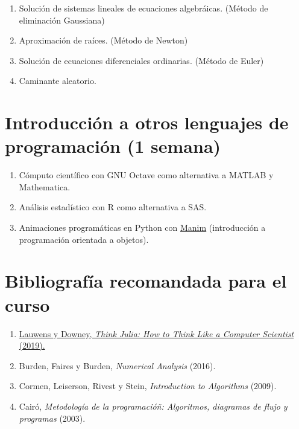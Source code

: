 \documentclass[a4paper]{article}
\begin{document}
\begin{enumerate}[label=\arabic*.]

    \item Solución de sistemas lineales de ecuaciones algebráicas. (Método de eliminación Gaussiana)
    \item Aproximación de raíces. (Método de Newton)
    \item Solución de ecuaciones diferenciales ordinarias. (Método de Euler)
    \item Caminante aleatorio.
\end{enumerate}

\section{Introducción a otros lenguajes de programación (1 semana)} \label{Sec: Introducción a otros lenguajes de programación (1 semana)}

\begin{enumerate}[label=\arabic*.]

    \item Cómputo científico con GNU Octave como alternativa a MATLAB y Mathematica.
    \item Análisis estadístico con R como alternativa a SAS.
    \item Animaciones programáticas en Python con \hyperlink{https://github.com/ManimCommunity/manim}{Manim} (introducción a programación orientada a objetos).
\end{enumerate}

\section*{Bibliografía recomandada para el curso} \label{Sec: Bibliografía}

\begin{enumerate}

    \item \href{https://benlauwens.github.io/ThinkJulia.jl/latest/book.html}{Lauwens y Downey, \emph{Think Julia: How to Think Like a Computer Scientist} (2019).}

    \item Burden, Faires y Burden, \emph{Numerical Analysis} (2016).

    \item Cormen, Leiserson, Rivest y Stein, \emph{Introduction to Algorithms} (2009).

    \item Cairó, \emph{Metodología de la programacióñ: Algoritmos, diagramas de flujo y programas} (2003).
\end{enumerate}
\end{document}

